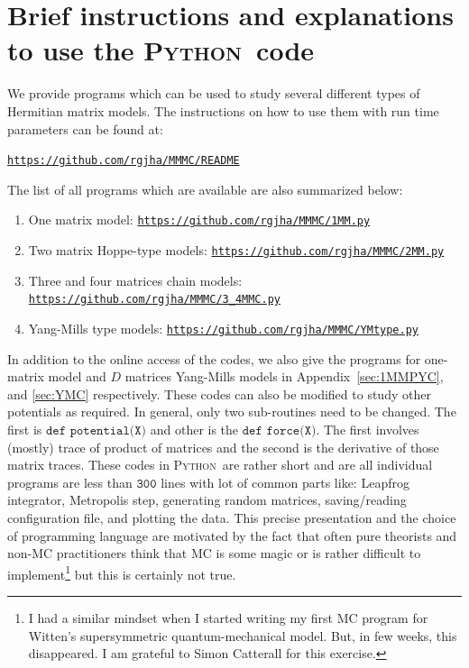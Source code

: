 \documentclass[letter,11pt]{article}
\newcommand{\PY}{\textsc{Python}}
\begin{document}
\section{\label{sec:BEOC}Brief instructions and explanations to use the \PY~code}
We provide programs which can be used to study several different types of Hermitian matrix models. 
The instructions on how to use them with run time parameters 
can be found at:  
\begin{center} \texttt{\href{https://github.com/rgjha/MMMC\#readme}{https://github.com/rgjha/MMMC/README}} \end{center}
The list of all programs which are available are also summarized below:
\begin{enumerate}
	\item One matrix model: \texttt{\href{https://github.com/rgjha/MMMC/blob/main/1MM.py}{https://github.com/rgjha/MMMC/1MM.py}}
	\item Two matrix Hoppe-type models: \texttt{\href{https://github.com/rgjha/MMMC/blob/main/2MM.py}{https://github.com/rgjha/MMMC/2MM.py}}  
	\item Three and four matrices chain models: \texttt{\href{https://github.com/rgjha/MMMC/blob/main/3_4MMC.py}{https://github.com/rgjha/MMMC/3\_4MMC.py}}
	\item Yang-Mills type models: \texttt{\href{https://github.com/rgjha/MMMC/blob/main/YMtype.py}{https://github.com/rgjha/MMMC/YMtype.py}}
\end{enumerate}
In addition to the online access of the codes, we also give the programs 
for one-matrix model and $D$ matrices Yang-Mills models in Appendix~\ref{sec:1MMPYC}, and \ref{sec:YMC} respectively.
These codes can also be modified to study other potentials as required. 
In general, only two sub-routines need to be changed. 
The first is $\texttt{def potential(X)}$ and other is the $\texttt{def force(X)}$. 
The first involves (mostly) trace of product of matrices and the second is the 
derivative of those matrix traces. 
These codes in \PY~are rather short
and are all individual programs are less than $\texttt{300}$ lines 
with lot of common parts like: Leapfrog integrator, Metropolis step, generating random matrices, saving/reading configuration file, and plotting the data. 
This precise presentation and the choice of programming language are motivated by the fact that often pure theorists and non-MC practitioners think that 
MC is some magic or is rather difficult to implement\footnote{I had a similar mindset when I started writing my first MC program for Witten's supersymmetric 
quantum-mechanical model. But, in few weeks, this disappeared. I am grateful to Simon Catterall for this exercise.} but this is certainly not true. 
\end{document}
